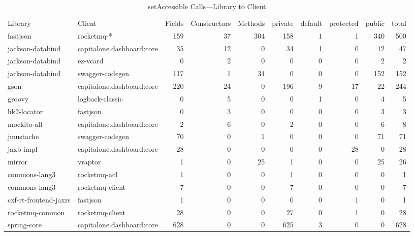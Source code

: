 \begin{table*}[ht]
\centering
\caption{\label{tab:set-accessible-lib-to-client}setAccessible Calls---Library to Client} 
\begingroup\scriptsize
\begin{tabular}{ll!{\color{verylightgray}\vrule}rrr!{\color{verylightgray}\vrule}rrrr!{\color{verylightgray}\vrule}r}
Library & Client & Fields & Constructors & Methods & private & default & protected & public & total \\ 
 \hline
  fastjson              & rocketmq-*                & 159 & 37 & 304 & 158 &1 &  1  & 340 & 500 \\ 
  jackson-databind      & capitalone.dashboard:core & 35 & 12 & 0    & 34  &1 &  0  & 12 & 47 \\ 
  jackson-databind      & ez-vcard                  & 0 & 2 & 0      & 0   &0 &  0  & 2 & 2 \\ 
  jackson-databind      & swagger-codegen           & 117 & 1 & 34   & 0   &0 &  0  & 152 & 152 \\ 
  gson                  & capitalone.dashboard:core & 220 & 24 & 0   & 196 &9 &  17 & 22 & 244 \\ 
  groovy                & logback-classic           & 0 & 5 & 0      & 0   &1 &  0  & 4 & 5 \\ 
  hk2-locator           & fastjson                  & 0 & 3 & 0      & 0   &0 &  0  & 3 & 3 \\ 
  mockito-all           & capitalone.dashboard:core & 2 & 6 & 0      & 2   &0 &  0  & 6 & 8 \\ 
  jmustache             & swagger-codegen           & 70 & 0 & 1     & 0   &0 &  0  & 71 & 71 \\ 
  jaxb-impl             & capitalone.dashboard:core & 28 & 0 & 0     & 0   &0 &  28 & 0 & 28 \\ 
  mirror                & vraptor                   & 1 & 0 & 25     & 1   &0 &  0  & 25 & 26 \\ 
  commons-lang3         & rocketmq-acl              & 1 & 0 & 0      & 1   &0 &  0  & 0 & 1 \\ 
  commons-lang3         & rocketmq-client           & 7 & 0 & 0      & 7   &0 &  0  & 0 & 7 \\ 
  cxf-rt-frontend-jaxrs & fastjson                  & 1 & 0 & 0      & 0   &0 &  1  & 0 & 1 \\ 
  rocketmq-common       & rocketmq-client           & 28 & 0 & 0     & 27  &0 &  1  & 0 & 28 \\ 
  spring-core           & capitalone.dashboard:core & 628 & 0 & 0    & 625 &3 &  0  & 0 & 628 \\ 
\end{tabular}
\endgroup
\end{table*}
